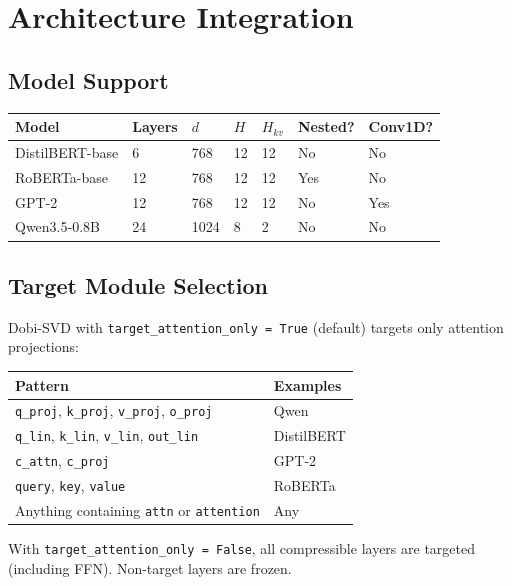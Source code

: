 
\section{Architecture Integration}

\subsection{Model Support}

\begin{table}[H]
\centering
\small
\begin{tabular}{lllllll}
\toprule
\textbf{Model} & \textbf{Layers} & \textbf{$d$} & \textbf{$H$} & \textbf{$H_{kv}$} & \textbf{Nested?} & \textbf{Conv1D?} \\
\midrule
DistilBERT-base & 6 & 768 & 12 & 12 & No & No \\
RoBERTa-base & 12 & 768 & 12 & 12 & Yes & No \\
GPT-2 & 12 & 768 & 12 & 12 & No & Yes \\
Qwen3.5-0.8B & 24 & 1024 & 8 & 2 & No & No \\
\bottomrule
\end{tabular}
\end{table}

\subsection{Target Module Selection}

Dobi-SVD with \texttt{target\_attention\_only = True} (default) targets only 
attention projections:

\begin{table}[H]
\centering
\small
\begin{tabular}{ll}
\toprule
\textbf{Pattern} & \textbf{Examples} \\
\midrule
\texttt{q\_proj}, \texttt{k\_proj}, \texttt{v\_proj}, \texttt{o\_proj} & Qwen \\
\texttt{q\_lin}, \texttt{k\_lin}, \texttt{v\_lin}, \texttt{out\_lin} & DistilBERT \\
\texttt{c\_attn}, \texttt{c\_proj} & GPT-2 \\
\texttt{query}, \texttt{key}, \texttt{value} & RoBERTa \\
Anything containing \texttt{attn} or \texttt{attention} & Any \\
\bottomrule
\end{tabular}
\end{table}

With \texttt{target\_attention\_only = False}, all compressible layers are targeted 
(including FFN). Non-target layers are frozen.

